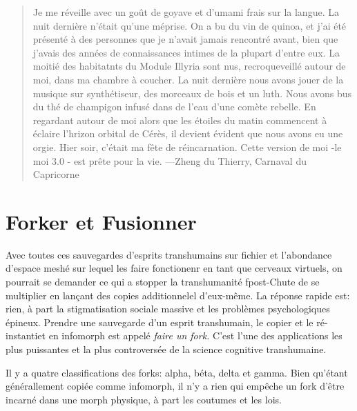 \begin{quotation} Je me réveille avec un goût de goyave et d'umami frais sur la langue. La nuit dernière n'était qu'une méprise. On a bu du vin de quinoa, et j'ai été présenté à des personnes que je n'avait jamais rencontré avant, bien que j'avais des années de connaissances intimes de la plupart d'entre eux. La moitié des habitatnts du Module Illyria sont nus, recroqueveillé autour de moi, dans ma chambre à coucher. La nuit dernière nous avons jouer de la musique sur synthétiseur, des morceaux de bois et un luth. Nous avons bus du thé de champigon infusé dans de l'eau d'une comète rebelle. En regardant autour de moi alors que les étoiles du matin commencent à éclaire l'hrizon orbital de Cérès, il devient évident que nous avons eu une orgie. Hier soir, c'était ma fête de réincarnation. Cette version de moi -le moi 3.0 - est prête pour la vie. —Zheng du Thierry, Carnaval du Capricorne \end{quotation} 



\section{Forker et Fusionner} 

Avec toutes ces sauvegardes d'esprits transhumains sur fichier et l'abondance d'espace meshé sur lequel les faire fonctionenr en tant que cerveaux virtuels, on pourrait se demander ce qui a stopper la transhumanité fpost-Chute de se multiplier en lançant des copies additionnelel d'eux-même. La réponse rapide est: rien, à part la stigmatisation sociale massive et les problèmes psychologiques épineux. Prendre une sauvegarde d'un esprit transhumain, le copier et le ré-instantiet en infomorph est appelé \textit{faire un fork.} C'est l'une des applications les plus puissantes et la plus controversée de la science cognitive transhumaine. 

Il y a quatre classifications des forks: alpha, béta, delta et gamma. Bien qu'étant générallement copiée comme infomorph, il n'y a rien qui empêche un fork d'être incarné dans une morph physique, à part les coutumes et les lois. 


